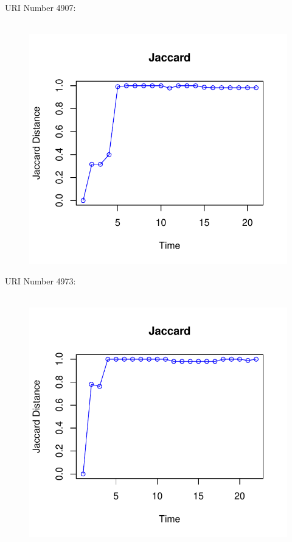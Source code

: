 \documentclass[12pt]{article}
\begin{document}
URI Number 4907:\\
\begin{figure}[H]
    \centering
    \includegraphics[scale=0.7]{4907.pdf}
\end{figure}

URI Number 4973:\\
\begin{figure}[H]
    \centering
    \includegraphics[scale=0.7]{4973.pdf}
\end{figure}
\end{document}
